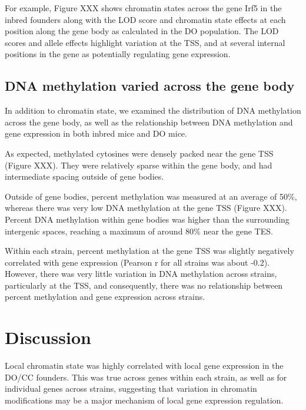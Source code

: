 \documentclass[10pt,letterpaper]{article}
\begin{document}
For example, Figure XXX shows chromatin states across the gene Irf5 in
the inbred founders along with the LOD score and chromatin state effects
at each position along the gene body as calculated in the DO population.
The LOD scores and allele effects highlight variation at the TSS, and at
several internal positions in the gene as potentially regulating gene
expression.

\hypertarget{dna-methylation-varied-across-the-gene-body}{%
\subsection{DNA methylation varied across the gene
body}\label{dna-methylation-varied-across-the-gene-body}}

In addition to chromatin state, we examined the distribution of DNA
methylation across the gene body, as well as the relationship between
DNA methylation and gene expression in both inbred mice and DO mice.

As expected, methylated cytosines were densely packed near the gene TSS
(Figure XXX). They were relatively sparse within the gene body, and had
intermediate spacing outside of gene bodies.

Outside of gene bodies, percent methylation was measured at an average
of 50\%, whereas there was very low DNA methylation at the gene TSS
(Figure XXX). Percent DNA methylation within gene bodies was higher than
the surrounding intergenic spaces, reaching a maximum of around 80\%
near the gene TES.

Within each strain, percent methylation at the gene TSS was slightly
negatively correlated with gene expression (Pearson r for all strains
was about -0.2). However, there was very little variation in DNA
methylation across strains, particularly at the TSS, and consequently,
there was no relationship between percent methylation and gene
expression across strains.

\hypertarget{discussion}{%
\section{Discussion}\label{discussion}}

Local chromatin state was highly correlated with local gene expression
in the DO/CC founders. This was true across genes within each strain, as
well as for individual genes across strains, suggesting that variation
in chromatin modifications may be a major mechanism of local gene
expression regulation.
\end{document}
